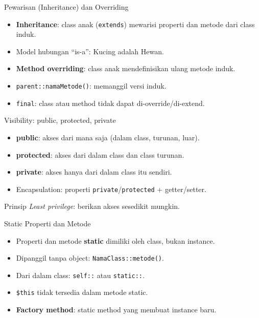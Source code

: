 \documentclass[handout]{beamer}
\begin{document}
\begin{frame}{Pewarisan (Inheritance) dan Overriding}
	\begin{itemize}
		\item \textbf{Inheritance}: class anak (\texttt{extends}) mewarisi properti dan metode dari class induk.
		\item Model hubungan ``is-a'': Kucing adalah Hewan.
		\item \textbf{Method overriding}: class anak mendefinisikan ulang metode induk.
		\item \texttt{parent::namaMetode()}: memanggil versi induk.
		\item \texttt{final}: class atau method tidak dapat di-override/di-extend.
	\end{itemize}
\end{frame}

\begin{frame}{Visibility: public, protected, private}
	\begin{itemize}
		\item \textbf{public}: akses dari mana saja (dalam class, turunan, luar).
		\item \textbf{protected}: akses dari dalam class dan class turunan.
		\item \textbf{private}: akses hanya dari dalam class itu sendiri.
		\item Encapsulation: properti \texttt{private}/\texttt{protected} + getter/setter.
	\end{itemize}
	\begin{block}{Prinsip}
		\textit{Least privilege}: berikan akses sesedikit mungkin.
	\end{block}
\end{frame}

\begin{frame}{Static Properti dan Metode}
	\begin{itemize}
		\item Properti dan metode \textbf{static} dimiliki oleh class, bukan instance.
		\item Dipanggil tanpa object: \texttt{NamaClass::metode()}.
		\item Dari dalam class: \texttt{self::} atau \texttt{static::}.
		\item \texttt{\$this} tidak tersedia dalam metode static.
		\item \textbf{Factory method}: static method yang membuat instance baru.
	\end{itemize}
\end{frame}
\end{document}
